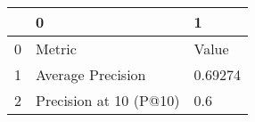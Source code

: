 \begin{tabular}{lll}
\toprule
{} &                       0 &        1 \\
\midrule
0 &                  Metric &    Value \\
1 &       Average Precision &  0.69274 \\
2 &  Precision at 10 (P@10) &      0.6 \\
\bottomrule
\end{tabular}
